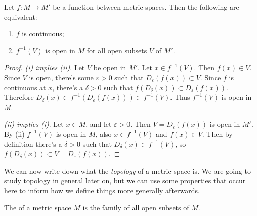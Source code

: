 \begin{proposition}
    Let $f: M \rightarrow M'$ be a function between metric spaces. Then the following are equivalent:
    \begin{enumerate}[label=(\roman*)]
        \item $f$ is continuous;
        \item $f^{-1}(V)$ is open in $M$ for all open subsets $V$ of $M'$.
    \end{enumerate}
\end{proposition}
\begin{proof}
    \emph{(i) implies (ii)}. Let $V$ be open in $M'$. Let $x \in f^{-1}(V)$. Then $f(x) \in V$. Since $V$ is open, there's some $\varepsilon > 0$ such that $D_{\varepsilon}(f(x)) \subset V$. Since $f$ is continuous at $x$, there's a $\delta > 0$ such that $f(D_{\delta}(x)) \subset D_{\varepsilon}(f(x))$. Therefore $D_{\delta}(x) \subset f^{-1}(D_\varepsilon (f(x))) \subset f^{-1}(V)$. Thus $f^{-1}(V)$ is open in $M$.

    \emph{(ii) implies (i)}. Let $x \in M$, and let $\varepsilon > 0$. Then $V = D_{\varepsilon}(f(x))$ is open in $M'$. By (ii) $f^{-1}(V)$ is open in $M$, also $x \in f^{-1}(V)$ and $f(x) \in V$. Then by definition there's a $\delta > 0$ such that $D_{\delta}(x) \subset f^{-1}(V)$, so $f(D_{\delta}(x)) \subset V = D_\varepsilon(f(x))$.
\end{proof}

We can now write down what the \emph{topology} of a metric space is. We are going to study topology in general later on, but we can use some properties that occur here to inform how we define things more generally afterwards.

\begin{definition}
    The  of a metric space $M$ is the family of all open subsets of $M$.
\end{definition}


